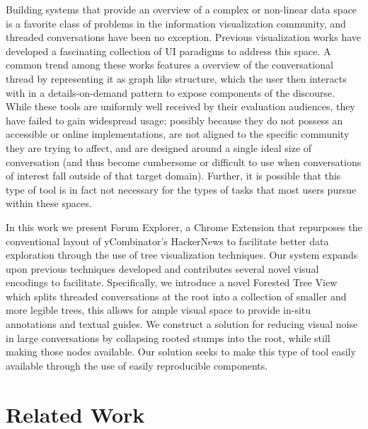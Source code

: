 \documentclass{egpubl}
\begin{document}
Building systems that provide an overview of a complex or non-linear data space is a favorite class of problems in the information visualization community, and threaded conversations have been no exception. Previous visualization works have developed a fascinating collection of UI paradigms to address this space. A common trend among these works features a overview of the conversational thread by representing it as graph like structure, which the user then interacts with in a details-on-demand \cite{shneiderman1996eyes} pattern to expose components of the discourse. While these tools are uniformly well received by their evaluation audiences, they have failed to gain widespread usage; possibly because they do not possess an accessible or online implementations, are not aligned to the specific community they are trying to affect, and are designed around a single ideal size of conversation (and thus become cumbersome or difficult to use when conversations of interest fall outside of that target domain). Further, it is possible that this type of tool is in fact not necessary for the types of tasks that most users pursue within these spaces.

In this work we present Forum Explorer, a Chrome Extension that repurposes the conventional layout of yCombinator's HackerNews \cite{hackernews} to facilitate better data exploration through the use of tree visualization techniques. Our system expands upon previous techniques developed and contributes several novel visual encodings to facilitate. Specifically, we introduce a novel Forested Tree View which splits threaded conversations at the root into a collection of smaller and more legible trees, this allows for ample visual space to provide in-situ annotations and textual guides. We construct a solution for reducing visual noise in large conversations by collapsing rooted stumps into the root, while still making those nodes available. Our solution seeks to make this type of tool easily available through the use of easily reproducible components.

 
 \section{Related Work}
 
\end{document}

